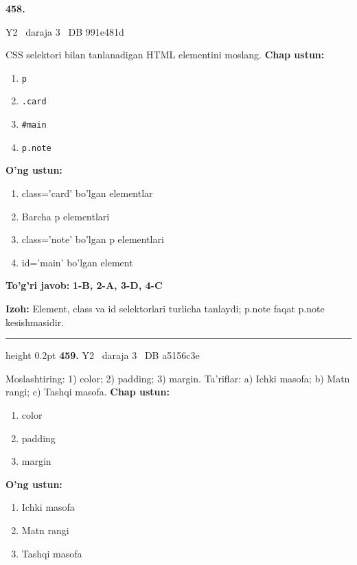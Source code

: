 \documentclass[10pt,a4paper,oneside]{article}
\begin{document}
\hypertarget{q458}{\textbf{\color{ink}458.}}  {\color{muted}\scriptsize Y2 \textbullet\ daraja 3 \textbullet\ DB 991e481d}
\par
CSS selektori bilan tanlanadigan HTML elementini moslang.
\textbf{\footnotesize Chap ustun:}
\begin{enumerate}[label=\arabic*),leftmargin=9mm]
\item \texttt{p}
\item \texttt{.card}
\item \texttt{\#main}
\item \texttt{p.note}
\end{enumerate}
\textbf{\footnotesize O'ng ustun:}
\begin{enumerate}[label=\Alph*),leftmargin=9mm]
\item class='card' bo'lgan elementlar
\item Barcha p elementlari
\item class='note' bo'lgan p elementlari
\item id='main' bo'lgan element
\end{enumerate}
\begin{tcolorbox}[enhanced,breakable,colback=teal!4,colframe=teal!45!black,boxrule=0.45pt,arc=1.2mm,left=2.8mm,right=2.8mm,top=2mm,bottom=2mm,before skip=2mm,after skip=2mm]
\textbf{\color{teal}To'g'ri javob:} \textbf{1-B, 2-A, 3-D, 4-C}
\par\smallskip
\textbf{Izoh:} Element, class va id selektorlari turlicha tanlaydi; p.note faqat p.note kesishmasidir.
\end{tcolorbox}
\vspace{2mm}\hrule height 0.2pt \vspace{4mm}
\hypertarget{q459}{\textbf{\color{ink}459.}}  {\color{muted}\scriptsize Y2 \textbullet\ daraja 3 \textbullet\ DB a5156c3e}
\par
Moslashtiring: 1) color; 2) padding; 3) margin. Ta'riflar: a) Ichki masofa; b) Matn rangi; c) Tashqi masofa.
\textbf{\footnotesize Chap ustun:}
\begin{enumerate}[label=\arabic*),leftmargin=9mm]
\item color
\item padding
\item margin
\end{enumerate}
\textbf{\footnotesize O'ng ustun:}
\begin{enumerate}[label=\Alph*),leftmargin=9mm]
\item Ichki masofa
\item Matn rangi
\item Tashqi masofa
\end{enumerate}
\end{document}
